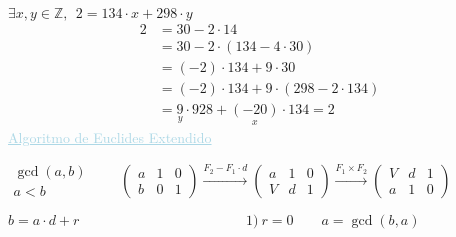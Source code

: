 \documentclass[12pt]{article}
\begin{document}
$\exists x,y\in\mathbb{Z},~~2=134\cdot x+298\cdot y$
\begin{align*}
	2 &= 30-2\cdot14\\
	 &=30-2\cdot(134-4\cdot30)\\
	 & =(-2)\cdot 134+9\cdot30\\
	 &=(-2)\cdot134+9\cdot(298-2\cdot134)\\
	 &=\underset{\displaystyle y}{9}\cdot928+\underset{\displaystyle x}{(-20)}\cdot134=2
\end{align*}
\textcolor{lightblue}{\underline{Algoritmo de Euclides Extendido}}

$\begin{array}{l}
	\gcd(a,b)\\
	a<b
\end{array}\qquad\left(\begin{array}{c|cc}
a & 1 & 0\\
b & 0 & 1
\end{array}\right)\xrightarrow{F_2-F_1\cdot d}\left(\begin{array}{c|cc}
a & 1 & 0\\
V & d & 1
\end{array}\right)\xrightarrow{F_1\times F_2}\left(\begin{array}{c|cc}
V & d & 1\\
a & 1 & 0
\end{array}\right)$

$b=a\cdot d+r\hspace{5cm} 1)~r=0\qquad a=\gcd(b,a)$
\end{document}
